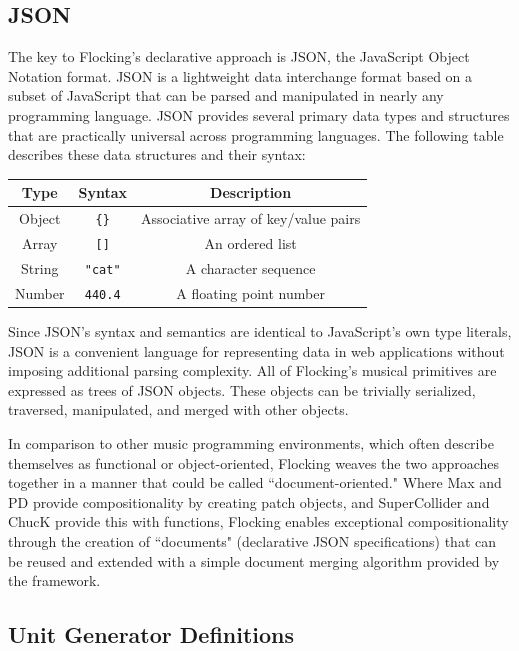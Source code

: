 \documentclass{article}
\begin{document}
\subsection{JSON}

The key to Flocking's declarative approach is JSON, the JavaScript Object Notation format. JSON is a lightweight data interchange format based on a subset of JavaScript that can be parsed and manipulated in nearly any programming language. JSON provides several primary data types and structures that are practically universal across programming languages. The following table describes these data structures and their syntax:

\begin{tabular}{| c || c | c |}
    \hline
    \bf{Type} & \bf{Syntax} & \bf{Description} \\ \hline
    Object & \verb|{}| & Associative array of key/value pairs \\ \hline
    Array & \verb|[]| & An ordered list \\ \hline
    String & \verb|"cat"| & A character sequence \\ \hline
    Number & \verb|440.4| & A floating point number \\ \hline
\end{tabular}

Since JSON's syntax and semantics are identical to JavaScript's own type literals, JSON is a convenient language for representing data in web applications without imposing additional parsing complexity. All of Flocking's musical primitives are expressed as trees of JSON objects. These objects can be trivially serialized, traversed, manipulated, and merged with other objects.

In comparison to other music programming environments, which often describe themselves as functional or object-oriented, Flocking weaves the two approaches together in a manner that could be called ``document-oriented." Where Max and PD provide compositionality by creating patch objects, and SuperCollider and ChucK provide this with functions, Flocking enables exceptional compositionality through the creation of ``documents" (declarative JSON specifications) that can be reused and extended with a simple document merging algorithm provided by the framework.

\subsection{Unit Generator Definitions}
\end{document}
